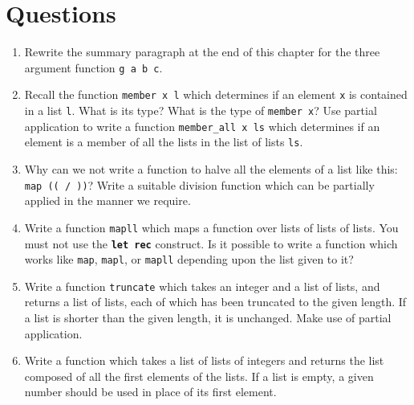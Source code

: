 \documentclass[]{book}
\newcommand{\pletrec}{\textbf{let rec}\xspace}
\begin{document}
\clearpage
\section*{Questions}

\begin{enumerate}
  \item Rewrite the summary paragraph at the end of this chapter for the three argument function \texttt{g\! a\! b\! c}.
  \item Recall the function \texttt{member\! x\! l} which determines if an element \texttt{x} is contained in a list \texttt{l}. What is its type? What is the type of \texttt{member\! x}? Use partial application to write a function \texttt{member\_all\! x\! ls} which determines if an element is a member of all the lists in the list of lists \texttt{ls}. 
  \item Why can we not write a function to halve all the elements of a list like this: \texttt{map\! ((\! /\! ))\! [10;\! 20;\! 30]}? Write a suitable division function which can be partially applied in the manner we require.
  \item Write a function \texttt{mapll} which maps a function over lists of lists of lists. You must not use the \texttt{\pletrec} construct. Is it possible to write a function which works like \texttt{map}, \texttt{mapl}, or \texttt{mapll} depending upon the list given to it?
  \item Write a function \texttt{truncate} which takes an integer and a list of lists, and returns a list of lists, each of which has been truncated to the given length. If a list is shorter than the given length, it is unchanged. Make use of partial application.
  \item Write a function which takes a list of lists of integers and returns the list composed of all the first elements of the lists. If a list is empty, a given number should be used in place of its first element.
\end{enumerate}

\cleardoublepage
\thispagestyle{empty}
\\
\end{document}
